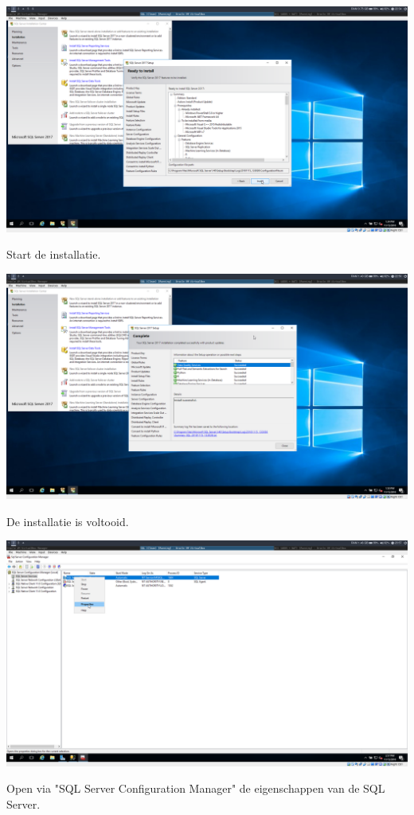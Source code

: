 \documentclass[a4paper]{article}
\begin{document}
\begin{center}
	\includegraphics[width=15cm]{Pictures/SQL/1542317645.png}
	
	Start de installatie.
\end{center}
\begin{center}
	\includegraphics[width=15cm]{Pictures/SQL/1542318646.png}
	
	De installatie is voltooid.
\end{center}
\begin{center}
	\includegraphics[width=15cm]{Pictures/SQL/1542322667.png}
	
	Open via "SQL Server Configuration Manager" de eigenschappen van de SQL Server.
\end{center}
\end{document}
